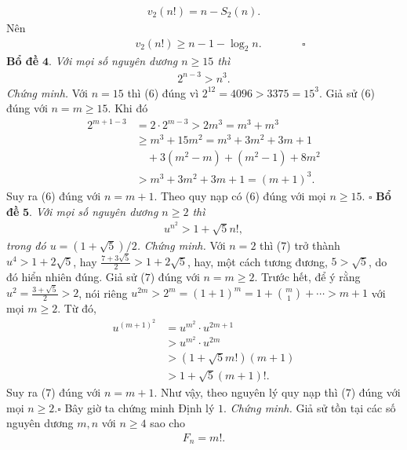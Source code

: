 \begin{multicols}{2}
	\begin{align*}
		v_2(n!)=n-S_2(n).
	\end{align*}
	Nên 
	\begin{align*}
	\quad\quad\quad	v_2(n!)\geq n-1-\log_2 n. \,\,\,\,\quad\quad\quad \square
	\end{align*}
	\textbf{\color{hoccungpi}Bổ đề} $\pmb{4.}$
	\textit{Với mọi số nguyên dương $n\geq 15$ thì}
		\begin{align*}
			2^{n-3}>n^3. \tag{$6$}
		\end{align*}
	\textit{Chứng minh.}
		Với $n=15$ thì ($6$) đúng vì $2^{12}=4096>3375=15^3$. Giả sử ($6$) đúng với $n=m\geq 15$. Khi đó 
		\begin{align*}
			2^{m+1-3} &=2\cdot 2^{m-3}>2m^3=m^3+m^3\\
			&\ge m^3+ 15m^2 = m^3 +\! 3m^2 \!+\! 3m +\! 1\\
			&\quad +3 (m^2-m)+ (m^2-1)+ 8m^2 \\
			&> m^3+3m^2+3m+1=(m+1)^3.
		\end{align*}
		Suy ra ($6$) đúng với $n=m+1$. Theo quy nạp có ($6$) đúng với mọi $n\geq 15$. \hfill $\square$
	\vskip 0.1cm
	\textbf{\color{hoccungpi}Bổ đề} $\pmb{5.}$
	\textit{Với mọi số nguyên dương $n\geq 2$ thì 
		\begin{align*}
			u^{n^2}>1+\sqrt{5}n!, \tag{$7$}
		\end{align*}
		trong đó $u=(1+\sqrt{5})/2$. }
	\vskip 0.1cm
	\textit{Chứng minh.} 
	Với $n=2$ thì ($7$) trở thành $u^4> 1+ 2\sqrt{5}$, hay $\frac{7+3\sqrt{5}}{2}> 1+ 2\sqrt{5}$, hay, một cách tương đương, $5> \sqrt{5}$, do đó hiển nhiên đúng. 
	\vskip 0.1cm	
	Giả sử ($7$) đúng với $n=m\geq 2$. Trước hết, để ý rằng $u^2 = \frac{3+ \sqrt{5}}{2}>2$, nói riêng $u^{2m}> 2^m= (1+1)^m = 1+ \binom{m}{1} + \cdots > m+1$ với mọi $m\ge 2$. Từ đó,
	\begin{align*}
			u^{(m+1)^2}&=u^{m^2}\cdot u^{2m+1}\\
			&> u^{m^2}\cdot u^{2m}\\
			&>(1+\sqrt{5}m!)(m+1)\\
			&>1+\sqrt{5}(m+1)!.
	\end{align*}
	Suy ra ($7$) đúng với $n=m+1$. Như vậy, theo nguyên lý quy nạp thì ($7$) đúng với mọi \linebreak $n\geq 2$.\hfill $\square$
	\vskip 0.1cm
	Bây giờ ta chứng minh Định lý $1$.
	\vskip 0.1cm
	\textit{Chứng minh.}
	Giả sử tồn tại các số nguyên dương $m,n$ với $n\geq 4$ sao cho
	\begin{align*}
			F_n=m!. \tag{$8$}
	\end{align*}

\end{multicols}
